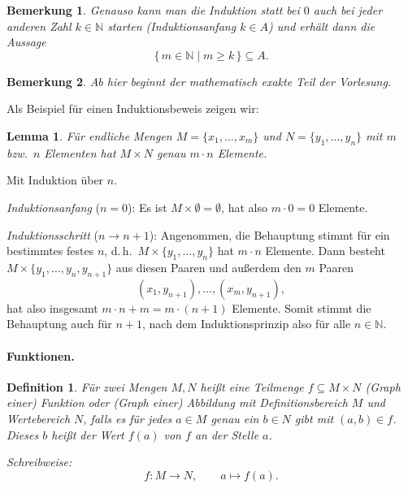 \documentclass[a4paper]{article}
\makeatletter
\theoremstyle{kurzskript}
\newtheorem{definition}[satz]{Definition}
\newtheorem{lemma}[satz]{Lemma}
\newtheorem*{bem}{Bemerkung}
\renewenvironment{proof}[1][\proofname]{\par\pushQED{\qed}%
  \normalfont\topsep\medskipamount\relax
  \trivlist\item[\hskip\labelsep\bfseries #1\@addpunct{.}]\ignorespaces}%
  {\popQED\endtrivlist\@endpefalse}
\renewcommand{\proofname}{Beweis}
\newcommand{\N}{\mathbb{N}}
\makeatother
\begin{document}
\begin{bem}
Genauso kann man die Induktion statt bei $0$ auch bei jeder anderen Zahl $k \in \N$ starten (Induktionsanfang $k \in A$) und erhält dann die Aussage
\[
  \{\, m \in \N \mid m \geq k \,\} \subseteq A.
\]
\end{bem}

\begin{bem}
Ab hier beginnt der mathematisch exakte Teil der Vorlesung.
\end{bem}

Als Beispiel für einen Induktionsbeweis zeigen wir:

\begin{lemma}
Für endliche Mengen $M = \{x_1, \dots, x_m\}$ und $N = \{y_1, \dots, y_n\}$ mit $m$ bzw.\ $n$ Elementen hat $M \times N$ genau $m \cdot n$ Elemente.
\end{lemma}

\begin{proof}
Mit Induktion über $n$.

\emph{Induktionsanfang} ($n = 0$): Es ist $M \times \emptyset = \emptyset$, hat also $m \cdot 0 = 0$ Elemente.

\emph{Induktionsschritt} ($n \to n+1$): Angenommen, die Behauptung stimmt für ein bestimmtes festes $n$, d.\,h.\ $M \times \{y_1, \dots, y_n\}$ hat $m \cdot n$ Elemente. Dann besteht $M \times \{y_1, \dots, y_n, y_{n+1}\}$ aus diesen Paaren und außerdem den $m$ Paaren
\[
  (x_1, y_{n+1}), \dots, (x_m, y_{n+1}),
\]
hat also insgesamt $m \cdot n + m = m \cdot (n+1)$ Elemente. Somit stimmt die Behauptung auch für $n + 1$, nach dem Induktionsprinzip also für alle $n \in \N$.
\end{proof}

\paragraph{Funktionen.}

\begin{definition}
Für zwei Mengen $M, N$ heißt eine Teilmenge $f \subseteq M \times N$ (\emph{Graph einer}) \emph{Funktion} oder (\emph{Graph einer}) \emph{Abbildung} mit \emph{Definitionsbereich} $M$ und \emph{Wertebereich} $N$, falls es für jedes $a \in M$ genau ein $b \in N$ gibt mit $(a, b) \in f$. Dieses $b$ heißt der \emph{Wert} $f(a)$ von $f$ an der Stelle $a$.

\emph{Schreibweise:}
\[
  f\colon M \to N, \qquad a \mapsto f(a).
\]
\end{definition}
\end{document}
